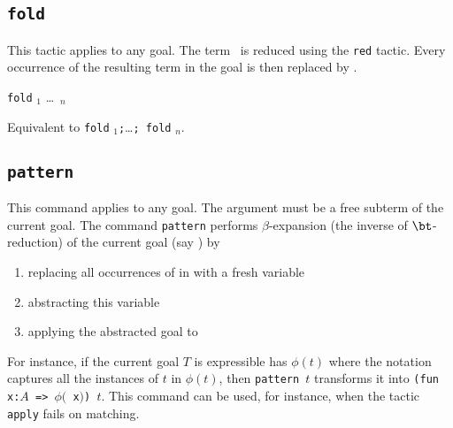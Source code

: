 \begin{coq_example*}

\subsection{\tt fold \term}

This tactic applies to any goal. The term \term\ is reduced using the {\tt red}
tactic. Every occurrence of the resulting term in the goal is then
replaced by \term.

\begin{Variants}
\item {\tt fold} \term$_1$ \dots\ \term$_n$

  Equivalent to {\tt fold} \term$_1${\tt;}\ldots{\tt; fold} \term$_n$.
\end{Variants}

\subsection{\tt pattern \term}
\label{pattern}

This command applies to any goal. The argument {\term} must be a free
subterm of the current goal.  The command {\tt pattern} performs
$\beta$-expansion (the inverse of $\bt$-reduction) of the current goal
(say \T) by
\begin{enumerate}
\item replacing all occurrences of {\term} in {\T} with a fresh variable
\item abstracting this variable
\item applying the abstracted goal to {\term}
\end{enumerate}

For instance, if the current goal $T$ is expressible has $\phi(t)$
where the notation captures all the instances of $t$ in $\phi(t)$,
then {\tt pattern $t$} transforms it into {\tt (fun x:$A$ => $\phi(${\tt
x}$)$) $t$}.  This command can be used, for instance, when the tactic
{\tt apply} fails on matching.


\end{coq_example*}
